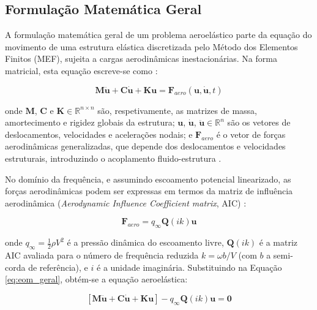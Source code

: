 \documentclass[11pt,oneside,a4paper,final]{report}
\begin{document}
\subsection{Formulação Matemática Geral}

A formulação matemática geral de um problema aeroelástico parte da equação do movimento de uma estrutura elástica discretizada pelo Método dos Elementos Finitos (MEF), sujeita a cargas aerodinâmicas inestacionárias. Na forma matricial, esta equação escreve-se como \cite{Hodges2011, Nastran2014}:

\begin{equation}
    \mathbf{M}\ddot{\mathbf{u}} + \mathbf{C}\dot{\mathbf{u}} + 
    \mathbf{K}\mathbf{u} = \mathbf{F}_{aero}(\mathbf{u}, 
    \dot{\mathbf{u}}, t)
    \label{eq:eom_geral}
\end{equation}

\noindent onde $\mathbf{M}$, $\mathbf{C}$ e $\mathbf{K} \in \mathbb{R}^{n \times n}$ são, respetivamente, as matrizes de massa, amortecimento e rigidez globais da estrutura; $\mathbf{u}$, $\dot{\mathbf{u}}$, $\ddot{\mathbf{u}} \in \mathbb{R}^{n}$ são os vetores de deslocamentos, velocidades e acelerações nodais; e $\mathbf{F}_{aero}$ é o vetor de forças aerodinâmicas generalizadas, que depende dos deslocamentos e velocidades estruturais, introduzindo o acoplamento fluido-estrutura \cite{Hodges2011}.

No domínio da frequência, e assumindo escoamento potencial linearizado, as forças aerodinâmicas podem ser expressas em termos da matriz de influência aerodinâmica (\textit{Aerodynamic Influence Coefficient matrix}, AIC) \cite{Roger1977}:

\begin{equation}
    \mathbf{F}_{aero} = q_\infty \mathbf{Q}(ik) \mathbf{u}
    \label{eq:forca_aero}
\end{equation}

\noindent onde $q_\infty = \frac{1}{2}\rho V^2$ é a pressão dinâmica do escoamento livre, $\mathbf{Q}(ik)$ é a matriz AIC avaliada para o número de frequência reduzida $k = \omega b/V$ (com $b$ a semi-corda de referência), e $i$ é a unidade imaginária. Substituindo na Equação \eqref{eq:eom_geral}, obtém-se a equação aeroelástica:

\begin{equation}
    \left[ \mathbf{M}\ddot{\mathbf{u}} + 
    \mathbf{C}\dot{\mathbf{u}} + 
    \mathbf{K}\mathbf{u} \right] - 
    q_\infty \mathbf{Q}(ik)\mathbf{u} = \mathbf{0}
    \label{eq:flutter_eq}
\end{equation}
\end{document}
